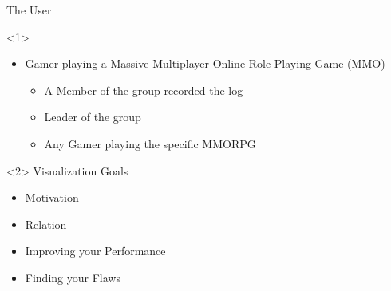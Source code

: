 \documentclass{beamer}
\begin{document}
\begin{frame}{The User}
\begin{onlyenv}<1>
	\begin{itemize}
		\item Gamer playing a Massive Multiplayer Online Role Playing Game (MMO)
		\begin{itemize}
			\item A Member of the group recorded the log
			\item Leader of the group
			\item Any Gamer playing the specific MMORPG
		\end{itemize}
	\end{itemize}
\end{onlyenv}
\begin{onlyenv}<2>
	Visualization Goals
	\begin{itemize}
		\item Motivation
		\item Relation
		\item Improving your Performance
		\item Finding your Flaws
	\end{itemize}
\end{onlyenv}
\end{frame}
\end{document}
